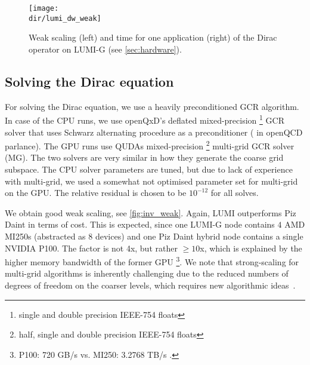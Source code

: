 \begin{figure}
    \centering
    \texttt{[image: \\dir/lumi\_dw\_weak]}
    \caption{Weak scaling (left) and time for one application (right) of the Dirac operator on LUMI-G (see \cref{sec:hardware}).}
    \label{fig:lumi_dw_weak}
\end{figure}

\subsection{Solving the Dirac equation}

For solving the Dirac equation, we use a heavily preconditioned GCR algorithm. In case of the CPU runs, we use openQxD's deflated mixed-precision%
\footnote{single and double precision IEEE-754 floats} GCR solver that uses Schwarz alternating procedure as a preconditioner ( in openQCD parlance). The GPU runs use QUDAs mixed-precision%
\footnote{half, single and double precision IEEE-754 floats} multi-grid GCR solver (MG). The two solvers are very similar in how they generate the coarse grid subspace. The CPU solver parameters are tuned, but due to lack of experience with multi-grid, we used a somewhat not optimised parameter set for multi-grid on the GPU. The relative residual is chosen to be $10^{-12}$ for all solves.

We obtain good weak scaling, see \cref{fig:inv_weak}. Again, LUMI outperforms Piz Daint in terms of cost. This is expected, since one LUMI-G node contains $4$ AMD MI250s (abstracted as $8$ devices) and one Piz Daint hybrid node contains a single NVIDIA P100. The factor is not 4x, but rather $\ge10$x, which is explained by the higher memory bandwidth of the former GPU \footnote{P100: 720 GB/s \cite{online:nv_p100} vs. MI250: 3.2768 TB/s \cite{online:amd_mi250}.}.
We note that strong-scaling for multi-grid algorithms is inherently challenging due to the reduced numbers of degrees of freedom on the coarser levels, which requires new algorithmic ideas~\cite{Espinoza-Valverde:2022pci}.


